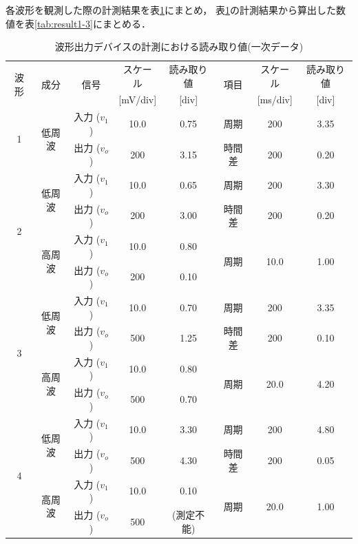 各波形を観測した際の計測結果を表\ref{tab:result1-2}にまとめ，
表\ref{tab:result1-2}の計測結果から算出した数値を表\ref{tab:result1-3}にまとめる．
\begin{table}[H]
  \caption{波形出力デバイスの計測における読み取り値(一次データ)}
  \centering
  \begin{tabular}{|c|c|c|c|c|c|c|c|}
    \hline
    \multirow{2}{*}{波形} & \multirow{2}{*}{成分} & \multirow{2}{*}{信号} & スケール & 読み取り値 & \multirow{2}{*}{項目} & スケール & 読み取り値 \\[-4pt]
    & & & [mV/div] & [div] & & [ms/div] & [div] \\
    \hline \hline
    \multirow{2}{*}{1} & \multirow{2}{*}{低周波} & 入力 ($v_1$) & 10.0 & 0.75 & 周期 & 200 & 3.35 \\
    \cline{3-8}
    & & 出力 ($v_o$) & 200 & 3.15 & 時間差 & 200 & 0.20 \\
    \hline
    \multirow{4}{*}{2} & \multirow{2}{*}{低周波} & 入力 ($v_1$) & 10.0 & 0.65 & 周期 & 200 & 3.30 \\
    \cline{3-8}
    & & 出力 ($v_o$) & 200 & 3.00 & 時間差 & 200 & 0.20 \\
    \cline{2-8}
    & \multirow{2}{*}{高周波} & 入力 ($v_1$) & 10.0 & 0.80 & \multirow{2}{*}{周期} & \multirow{2}{*}{10.0} & \multirow{2}{*}{1.00} \\
    \cline{3-5}
    & & 出力 ($v_o$) & 200 & 0.10 & & & \\
    \hline
    \multirow{4}{*}{3} & \multirow{2}{*}{低周波} & 入力 ($v_1$) & 10.0 & 0.70 & 周期 & 200 & 3.35 \\
    \cline{3-8}
    & & 出力 ($v_o$) & 500 & 1.25 & 時間差 & 200 & 0.10 \\
    \cline{2-8}
    & \multirow{2}{*}{高周波} & 入力 ($v_1$) & 10.0 & 0.80 & \multirow{2}{*}{周期} & \multirow{2}{*}{20.0} & \multirow{2}{*}{4.20} \\
    \cline{3-5}
    & & 出力 ($v_o$) & 500 & 0.70 & & & \\
    \hline
    \multirow{4}{*}{4} & \multirow{2}{*}{低周波} & 入力 ($v_1$) & 10.0 & 3.30 & 周期 & 200 & 4.80 \\
    \cline{3-8}
    & & 出力 ($v_o$) & 500 & 4.30 & 時間差 & 200 & 0.05 \\
    \cline{2-8}
    & \multirow{2}{*}{高周波} & 入力 ($v_1$) & 10.0 & 0.10 & \multirow{2}{*}{周期} & \multirow{2}{*}{20.0} & \multirow{2}{*}{1.00} \\
    \cline{3-5}
    & & 出力 ($v_o$) & 500 & (測定不能) & & & \\
    \hline
  \end{tabular}
  \label{tab:result1-2}
\end{table}
